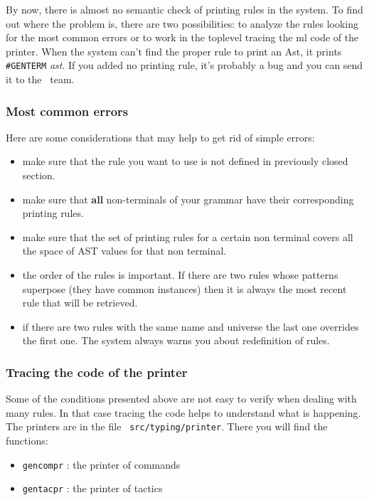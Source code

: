   By now, there is almost no semantic check of printing rules in the
  system.  To find out where the problem is, there are two
  possibilities: to analyze the rules looking for the most common
  errors or to work in the toplevel tracing the ml code of the
  printer.
When the system can't find the proper rule to print an Ast, it prints
\verb+#GENTERM+ \textit{ast}. If you added no printing rule,
  it's probably a bug and you can send it to the \Coq\ team.

\subsubsection{Most common errors}
Here are some considerations that may help to get rid of simple
errors:

\begin{itemize}
\item make sure that the rule you want to use is not defined in
  previously closed section.
\item make sure that {\bf all} non-terminals of your grammar have
  their corresponding printing rules.

\item make sure that the set of printing rules for a certain non
  terminal covers all the space of AST values for that non terminal.

\item the order of the rules is important. If there are two rules
  whose patterns superpose (they have common instances) then it is
  always the most recent rule that will be retrieved.
\item if there are two rules with the same name and universe the last
  one overrides the first one. The system always warns you about
  redefinition of rules.
\end{itemize}

\subsubsection{Tracing the {\ocaml} code of the printer}
Some of the conditions presented above are not easy to verify when
dealing with many rules. In that case tracing the code helps to
understand what is happening. The printers are in the file {\tt
src/typing/printer}. There you will find the functions:

\begin{itemize}
\item {\tt gencompr} : the printer of commands
\item {\tt gentacpr} : the printer of tactics
\end{itemize}

